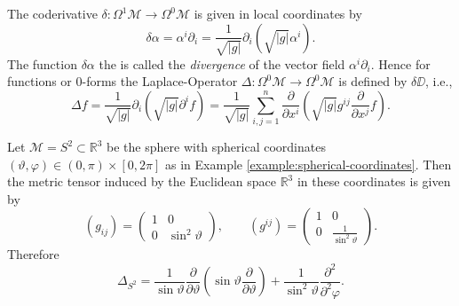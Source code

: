 The coderivative $\delta: \Omega^1 \mathscr{M} \to \Omega^0 \mathscr{M}$ is given in local coordinates by
\begin{equation}
	\delta \alpha 
	= \alpha^i \partial_i
	= \frac{1}{\sqrt{|g|}} \partial_i \left(\sqrt{|g|} \alpha^i \right)
	.
	\label{eq:semi-Riemannian-coderivative}
\end{equation}
The function $\delta \alpha$ the is called the \emph{divergence} of the vector field $\alpha^i \partial_i$.
Hence for functions or 0-forms the Laplace-Operator $\Delta : \Omega^0 \mathscr{M} \to \Omega^0 \mathscr{M}$ is defined by $\delta \DD$, i.e.,
\begin{equation}
	\Delta f
	= \frac{1}{\sqrt{|g|}} \partial_i \left(\sqrt{|g|} \partial^i f \right)
	= \frac{1}{\sqrt{|g|}} \sum_{i,j=1}^n 
	\frac{\partial}{\partial x^i} \left(\sqrt{|g|} g^{ij} \frac{\partial}{\partial x^j} f \right)
	.
	\label{eq:semi-Riemannian-Laplacian}
\end{equation}

\begin{beispiel}
	Let $\mathscr{M} = S^2 \subset \mathbb{R}^3$ be the sphere 
	with spherical coordinates $(\vartheta, \varphi) \in (0,\pi) \times [0, 2\pi]$
	as in Example \ref{example:spherical-coordinates}. 
	Then the metric tensor induced by the Euclidean space $\mathbb{R}^3$ in these coordinates is given by
	\begin{equation}
		(g_{ij})
		= \left(\begin{array}{cc}
			1 & 0 \\ 0 & \sin^2 \vartheta 
		\end{array}
		\right),
		\qquad
		(g^{ij})
		= \left(\begin{array}{cc}
			1 & 0 \\ 0 & \frac{1}{\sin^2 \vartheta} 
		\end{array}
		\right)
		.
	\end{equation}
	Therefore \cite[256]{Jaenich-1992}
	\begin{equation}
		\Delta_{S^2}
		= \frac{1}{\sin \vartheta} 
		\frac{\partial}{\partial \vartheta} \left(\sin \vartheta \frac{\partial}{\partial \vartheta} \right)
		+ \frac{1}{\sin^2 \vartheta} \frac{\partial^2}{\partial^2 \varphi}
		.
		\label{eq:S^2-Laplacian}
	\end{equation}
\end{beispiel}
